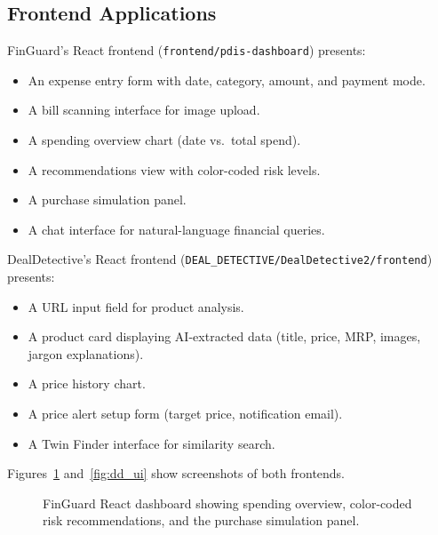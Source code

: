 \documentclass[]{IEEEtran}
\begin{document}
\subsection{Frontend Applications}

FinGuard's React frontend (\texttt{frontend/pdis-dashboard}) presents:
\begin{itemize}
    \item An expense entry form with date, category, amount, and payment mode.
    \item A bill scanning interface for image upload.
    \item A spending overview chart (date vs.\ total spend).
    \item A recommendations view with color-coded risk levels.
    \item A purchase simulation panel.
    \item A chat interface for natural-language financial queries.
\end{itemize}

DealDetective's React frontend (\texttt{DEAL\_DETECTIVE/DealDetective2/frontend}) presents:
\begin{itemize}
    \item A URL input field for product analysis.
    \item A product card displaying AI-extracted data (title, price, MRP, images, jargon explanations).
    \item A price history chart.
    \item A price alert setup form (target price, notification email).
    \item A Twin Finder interface for similarity search.
\end{itemize}

Figures~\ref{fig:fg_ui} and~\ref{fig:dd_ui} show screenshots of both frontends.

\begin{figure}[H]
    \centering
    \caption{FinGuard React dashboard showing spending overview, color-coded risk recommendations, and the purchase simulation panel.}
    \label{fig:fg_ui}
\end{figure}
\end{document}
